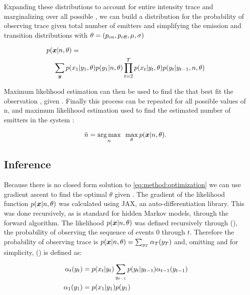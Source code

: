 Expanding these distributions to account for entire intensity trace \trace and marginalizing over all possible \states, we can build a distribution for the probability of observing trace \trace given total number of emitters \n and simplifying the emission and transition distributions with $\theta = (p_\text{on}, p_\text{off}, \mu, \sigma)$

\begin{align*}
  p(\bm{x}|n,\theta) &=\\
    \sum_{\bm{y}}
      p(&x_{1}|y_{1}, \theta)
      p(y_{1}|n, \theta)
      \prod_{t=2}^{T}
        p(x_{t}|y_{t}, \theta)
        p(y_{t}|y_{t-1},n, \theta)
  \label{eq:method:likelihood}
\end{align*}

Maximum likelihood estimation can then be used to find the \parameters that best fit the observation \trace, given \n. 
Finally this process can be repeated for all possible values of n, and maximum likelihood estimation used to find the estimated number of emitters in the system \estimatedn:

\begin{equation}
    \hat{n} =
    \mathop{\arg\max}_{n}\hspace{0.5em}
    \max_\theta
    p(\bm{x}|n,\theta)
  \text{.}
  \label{eq:method:optimization}
\end{equation}

\subsection{Inference}

Because there is no closed form solution to  \eqref{eq:method:optimization} we can use gradient ascent to find the optimal $\theta$ given \n.
The gradient of the likelihood function $p(\bm{x} | n, \theta)$ was calculated using JAX, an auto-differentiation library.
This was done recursively, as is standard for hidden Markov models, through the forward algorithm.
The likelihood $p(\bm{x} | n, \theta)$ was defined recursively through \pchain(), the probability of observing the sequence of events 0 through $t$.
Therefore the probability of observing trace \trace is $ p(\bm{x}|n,\theta) = \sum_{y_{T}} \alpha_T(y_{T})$ and, omitting \n and \parameters for simplicity, \pchain()  is defined as:

\begin{align*}
  \alpha_{t}(y_{t}) &= p(x_{t}|y_{t}) \sum_{y_{t-1}} p(y_{t} | y_{t-1}) \alpha_{t-1}(y_{t-1})\\
  \alpha_{1}(y_{1}) &= p(x_{1}|y_{1}) p(y_{1})
\end{align*}

